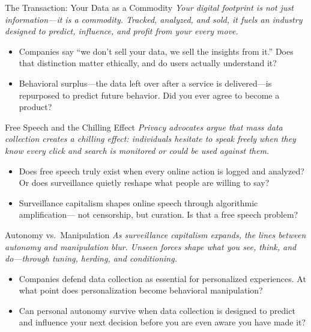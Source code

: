 \documentclass[aspectratio=169]{beamer}
\begin{document}
\begin{frame}{The Transaction: Your Data as a Commodity}
    \normalsize
    \textit{Your digital footprint is not just information---it is a commodity.
    Tracked, analyzed, and sold, it fuels an industry designed to predict,
    influence, and profit from your every move.}
    \vspace{0.3cm}

    \begin{itemize}
        \setlength\itemsep{0.3cm}
        \item Companies say ``we don't sell your data, we sell the insights from it.''
              Does that distinction matter ethically, and do users actually understand it?
        \item Behavioral surplus---the data left over after a service is delivered---is
              repurposed to predict future behavior.
              Did you ever agree to become a product?
    \end{itemize}
\end{frame}
\begin{frame}{Free Speech and the Chilling Effect}
    \normalsize
    \textit{Privacy advocates argue that mass data collection creates a chilling effect:
    individuals hesitate to speak freely when they know every click and search is
    monitored or could be used against them.}
    \vspace{0.3cm}

    \begin{itemize}
        \setlength\itemsep{0.3cm}
        \item Does free speech truly exist when every online action is logged and analyzed?
              Or does surveillance quietly reshape what people are willing to say?
        \item Surveillance capitalism shapes online speech through algorithmic amplification---
              not censorship, but curation. Is that a free speech problem?
    \end{itemize}
\end{frame}
\begin{frame}{Autonomy vs.\ Manipulation}
    \normalsize
    \textit{As surveillance capitalism expands, the lines between autonomy and manipulation blur.
    Unseen forces shape what you see, think, and do---through tuning, herding, and conditioning.}
    \vspace{0.3cm}

    \begin{itemize}
        \setlength\itemsep{0.3cm}
        \item Companies defend data collection as essential for personalized experiences.
              At what point does personalization become behavioral manipulation?
        \item Can personal autonomy survive when data collection is designed to predict
              and influence your next decision before you are even aware you have made it?
    \end{itemize}
\end{frame}
\end{document}
